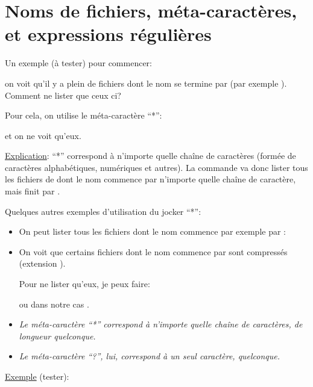 \section{Noms de fichiers, méta-caractères, et expressions régulières}
Un exemple (à tester) pour commencer:


\noindent on voit qu'il y a  plein de fichiers dont le nom se termine par
 (par exemple ). Comment ne lister que ceux ci?

Pour cela, on utilise le méta-caractère
``*'':


et on ne voit qu'eux.

\underline{Explication}: ``*'' correspond à n'importe quelle chaîne de caractères
(formée de caractères alphabétiques, numériques et autres).
La commande  va donc lister tous les fichiers
de  dont le nom commence par n'importe quelle chaîne de
caractère, mais finit par .

Quelques autres exemples d'utilisation du jocker ``*'':
\begin{itemize}
\item On peut lister
tous les fichiers dont le nom commence par exemple par :


\item On voit que certains fichiers dont le nom commence par
   sont compressés (extension
  ).

  Pour ne lister qu'eux, je peux faire:

 ou dans notre cas .
\end{itemize}\smallskip


\begin{center}
  \begin{minipage}{0.75\linewidth}
    \begin{itemize}
    \item \emph{Le méta-caractère ``*'' correspond à n'importe quelle
  chaîne de caractères, de longueur quelconque.} 
    \item \emph{Le méta-caractère ``?'', lui, correspond à un
        seul caractère, quelconque.}
    \end{itemize}
\end{minipage}
\end{center}
\underline{Exemple} (tester):



